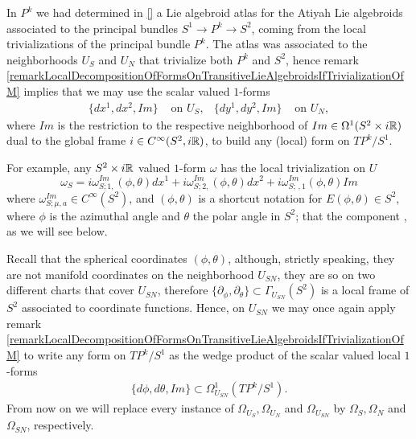 \lin

\begin{example}[$P^k$]
In $P^k$ we had determined in \ref{} a Lie algebroid atlas for the Atiyah Lie algebroids associated to the principal bundles $S^1 \to P^k \to S^2$, coming from the local trivializations of the principal bundle $P^k$. The atlas was associated to the neighborhoods $U_S$ and $U_N$ that trivialize both $P^k$ and $S^2$, hence remark \ref{remarkLocalDecompositionOfFormsOnTransitiveLieAlgebroidsIfTrivializationOfM} implies that we may use the scalar valued $1$-forms
\begin{align}
    \{dx^1, dx^2, Im\} &\text{ on } U_S, & \{dy^1, dy^2, Im\} &\text{ on } U_N,
\end{align}
where $Im$ is the restriction to the respective neighborhood of $Im \in \Omega^1(S^2 \times i\mathbb{R})$ dual to the global frame $i \in C^\infty(S^2, i\mathbb{R})$, to build any (local) form on $TP^k/S^1$.

For example, any $S^2 \times i\mathbb{R}$ valued $1$-form $\omega$ has the local trivialization on $U$
\begin{equation}
    \omega_S = i\omega^{Im}_{S; 1,}(\phi, \theta) dx^1 + i\omega^{Im}_{S; 2,}(\phi, \theta) dx^2 + i\omega^{Im}_{S; \, ,1}(\phi, \theta) Im
\end{equation}
where $\omega^{Im}_{S;\mu,  a} \in C^\infty(S^2)$, and $(\phi, \theta)$ is a shortcut notation for $E(\phi, \theta) \in S^2$, where $\phi$ is the azimuthal angle and $\theta$ the polar angle in $S^2$; that the component , as we will see below.

Recall that the spherical coordinates $(\phi, \theta)$, although, strictly speaking, they are not manifold coordinates on the neighborhood $U_{SN}$, they are so on two different charts that cover $U_{SN}$, therefore $\{\partial_\phi, \partial_\theta\} \subset \Gamma_{U_{SN}}(S^2)$ is a local frame of $S^2$ associated to coordinate functions. Hence, on $U_{SN}$ we may once again apply remark \ref{remarkLocalDecompositionOfFormsOnTransitiveLieAlgebroidsIfTrivializationOfM} to write any form on $TP^k/S^1$ as the wedge product of the scalar valued local $1$-forms
\begin{align}
    \{d\phi, d\theta, Im\} \subset \Omega^1_{U_{SN}}(TP^k/S^1).
\end{align} From now on we will replace every instance of $\Omega_{U_{S}}, \Omega_{U_{N}}$ and $\Omega_{U_{SN}}$ by $\Omega_{S}, \Omega_{N}$ and $\Omega_{SN}$, respectively.
\end{example}

